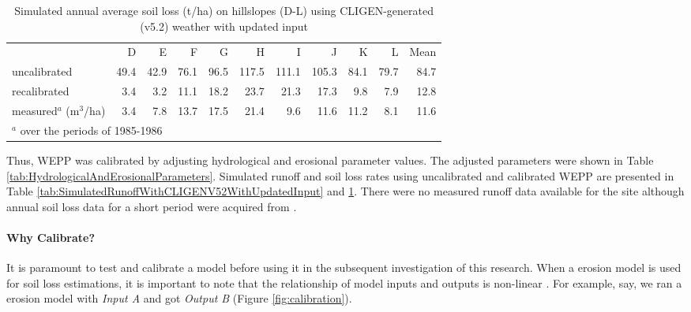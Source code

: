\begin{table}[htbp]
  \centering
  \caption[Simulated annual average soil loss on hillslopes using
CLIGEN-generated weather with updated input]{Simulated annual average soil loss
(t/ha) on hillslopes (D-L) using CLIGEN-generated (v5.2) weather with updated
input}
  \label{tab:SimulatedSoilLossWithCLIGENV52WithUpdatedInput}
  \footnotesize
    \begin{tabular}{lrrrrrrrrrr}
      \toprule
      & D & E & F & G & H & I & J & K & L & Mean\\
      \cmidrule{2-11}
      uncalibrated & 49.4 & 42.9 & 76.1 & 96.5 & 117.5 & 111.1
& 105.3 & 84.1 & 79.7 & 84.7\\
      recalibrated & 3.4 & 3.2 & 11.1 & 18.2 & 23.7 & 21.3 &
17.3 & 9.8 & 7.9 & 12.8\\
      measured$^a$ (m$^3$/ha) & 3.4 & 7.8 & 13.7 & 17.5 & 21.4
& 9.6 & 11.6 & 11.2 & 8.1 & 11.6\\
      \bottomrule
      \multicolumn{8}{l}{\footnotesize $^a$ over the periods
of 1985-1986 \citep[From][]{favis-mortlock1998-141}}
    \end{tabular}
\end{table}

Thus, WEPP was calibrated by adjusting hydrological and
erosional parameter values. The adjusted parameters were shown in Table
\ref{tab:HydrologicalAndErosionalParameters}. Simulated runoff and soil
loss rates using uncalibrated and calibrated WEPP are presented in Table
\ref{tab:SimulatedRunoffWithCLIGENV52WithUpdatedInput} and
\ref{tab:SimulatedSoilLossWithCLIGENV52WithUpdatedInput}. There were no measured
runoff data available for the site although annual soil loss data for a short
period were acquired from \citet{favis-mortlock1998-141}.

\paragraph{Why Calibrate?} It is paramount to test and calibrate a model before
using it in the subsequent investigation of this research. When a erosion model
is used for soil loss estimations, it is important to note that the relationship
of model inputs and outputs is non-linear
\citep{favis-mortlock1995-365,jetten1999-521}. For example, say, we ran a
erosion model with \emph{Input A} and got \emph{Output B}
(Figure \ref{fig:calibration}).

